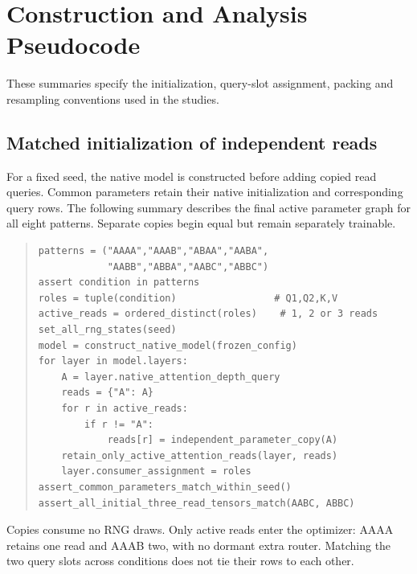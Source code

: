\documentclass[11pt,letterpaper]{article}
\newcommand{\route}[1]{\textsf{#1}}
\begin{document}
\section{Construction and Analysis Pseudocode}
\label{app:pseudocode}
These summaries specify the initialization, query-slot assignment, packing
and resampling conventions used in the studies.

\subsection{Matched initialization of independent reads}
For a fixed seed, the native model is constructed before adding copied read
queries. Common parameters retain their native initialization and corresponding
query rows. The following summary describes the final active parameter graph
for all eight patterns. Separate copies begin equal but remain separately
trainable.
\begin{quote}\small
\begin{verbatim}
patterns = ("AAAA","AAAB","ABAA","AABA",
            "AABB","ABBA","AABC","ABBC")
assert condition in patterns
roles = tuple(condition)                 # Q1,Q2,K,V
active_reads = ordered_distinct(roles)    # 1, 2 or 3 reads
set_all_rng_states(seed)
model = construct_native_model(frozen_config)
for layer in model.layers:
    A = layer.native_attention_depth_query
    reads = {"A": A}
    for r in active_reads:
        if r != "A":
            reads[r] = independent_parameter_copy(A)
    retain_only_active_attention_reads(layer, reads)
    layer.consumer_assignment = roles
assert_common_parameters_match_within_seed()
assert_all_initial_three_read_tensors_match(AABC, ABBC)
\end{verbatim}
\end{quote}
Copies consume no RNG draws. Only active reads enter the optimizer:
\route{AAAA} retains one read and \route{AAAB} two,
with no dormant extra router. Matching the two query
slots across conditions does not tie their rows to each other.
\end{document}
